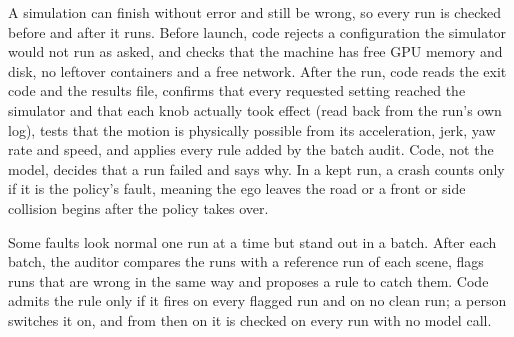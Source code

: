 \documentclass[conference]{IEEEtran}
\begin{document}
A simulation can finish without error and still be wrong, so every run is checked before and after it runs. Before launch, code rejects a configuration the simulator would not run as asked, and checks that the machine has free GPU memory and disk, no leftover containers and a free network. After the run, code reads the exit code and the results file, confirms that every requested setting reached the simulator and that each knob actually took effect (read back from the run's own log), tests that the motion is physically possible from its acceleration, jerk, yaw rate and speed, and applies every rule added by the batch audit. Code, not the model, decides that a run failed and says why. In a kept run, a crash counts only if it is the policy's fault, meaning the ego leaves the road or a front or side collision begins after the policy takes over.

Some faults look normal one run at a time but stand out in a batch. After each batch, the auditor compares the runs with a reference run of each scene, flags runs that are wrong in the same way and proposes a rule to catch them. Code admits the rule only if it fires on every flagged run and on no clean run; a person switches it on, and from then on it is checked on every run with no model call.
\end{document}
